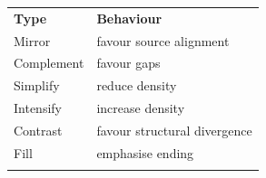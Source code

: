 {\def\LTcaptype{none} %
\begin{longtable}[]{@{}
  >{\raggedright\arraybackslash}p{}
  >{\raggedright\arraybackslash}p{}@{}}
\toprule\noalign{}
\begin{minipage}[b]{\linewidth}\centering
\textbf{Type}
\end{minipage} & \begin{minipage}[b]{\linewidth}\centering
\textbf{Behaviour}
\end{minipage} \\
\begin{minipage}[b]{\linewidth}\raggedright
Mirror
\end{minipage} & \begin{minipage}[b]{\linewidth}\raggedright
favour source alignment
\end{minipage} \\
\begin{minipage}[b]{\linewidth}\raggedright
Complement
\end{minipage} & \begin{minipage}[b]{\linewidth}\raggedright
favour gaps
\end{minipage} \\
\begin{minipage}[b]{\linewidth}\raggedright
Simplify
\end{minipage} & \begin{minipage}[b]{\linewidth}\raggedright
reduce density
\end{minipage} \\
\begin{minipage}[b]{\linewidth}\raggedright
Intensify
\end{minipage} & \begin{minipage}[b]{\linewidth}\raggedright
increase density
\end{minipage} \\
\begin{minipage}[b]{\linewidth}\raggedright
Contrast
\end{minipage} & \begin{minipage}[b]{\linewidth}\raggedright
favour structural divergence
\end{minipage} \\
\begin{minipage}[b]{\linewidth}\raggedright
Fill
\end{minipage} & \begin{minipage}[b]{\linewidth}\raggedright
emphasise ending
\end{minipage} \\
\midrule\noalign{}
\endhead
\bottomrule\noalign{}
\endlastfoot
\end{longtable}
}

